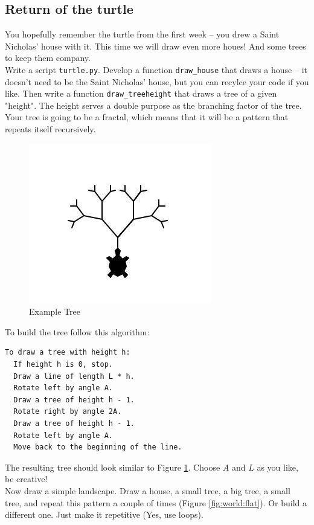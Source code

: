 \subsection{Return of the turtle}
\FloatBarrier
You hopefully remember the turtle from the first week -- you drew a Saint Nicholas' house with it.
This time we will draw even more houes! And some trees to keep them company.\\
Write a script \texttt{turtle.py}. Develop a function \texttt{draw\_house} that draws a house --
it doesn't need to be the Saint Nicholas' house, but you can recylce your code if you like.
Then write a function \texttt{draw\_tree{height}} that draws a tree of a given "height".
The height serves a double purpose as the branching factor of the tree. Your tree is going to be a fractal,
which means that it will be a pattern that repeats itself recursively.

\begin{figure}[h]
  \includegraphics[scale=0.8]{recursive_tree}
  \caption{Example Tree}
  \label{fig:tree:1}
\end{figure}


\noindent To build the tree follow this algorithm:\\
\begin{lstlisting}
To draw a tree with height h:
  If height h is 0, stop.
  Draw a line of length L * h.
  Rotate left by angle A.
  Draw a tree of height h - 1.
  Rotate right by angle 2A.
  Draw a tree of height h - 1.
  Rotate left by angle A.
  Move back to the beginning of the line.
\end{lstlisting}

\noindent The resulting tree should look similar to Figure \ref{fig:tree:1}. Choose $A$ and $L$ as you like, be creative!\\
Now draw a simple landscape. Draw a house, a small tree, a big tree, a small tree, and repeat this pattern a couple of times
(Figure \ref{fig:world:flat}). Or build a different one. Just make it repetitive (Yes, use loops).

